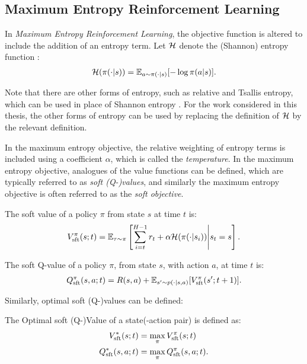 
    \subsection{Maximum Entropy Reinforcement Learning}

        In \textit{Maximum Entropy Reinforcement Learning}, the objective function is altered to include the addition of an entropy term. Let $\mathcal{H}$ denote the (Shannon) entropy function :
        \begin{align}
            \mathcal{H}(\pi(\cdot|s)) = \mathbb{E}_{a\sim\pi(\cdot|s)}[-\log \pi(a|s)].
        \end{align}

        Note that there are other forms of entropy, such as relative and Tsallis entropy, which can be used in place of Shannon entropy . For the work considered in this thesis, the other forms of entropy can be used by replacing the definition of $\mathcal{H}$ by the relevant definition.

        In the maximum entropy objective, the relative weighting of entropy terms is included using a coefficient $\alpha$, which is called the \textit{temperature}. In the maximum entropy objective, analogues of the value functions can be defined, which are typically referred to as \textit{soft (Q-)values}, and similarly the maximum entropy objective is often referred to as the \textit{soft objective}.

        \begin{defn}
            \label{def:sft_value}
            \label{def:sft_q_value}
            The \textnormal{soft value} of a policy $\pi$ from state $s$ at time $t$ is:
            \begin{align}
                V_{\textnormal{sft}}^{\pi}(s;t) = \mathbb{E}_{\tau\sim\pi}\left[\sum_{i=t}^{H-1} r_t + \alpha\mathcal{H}(\pi(\cdot|s_i)) \Bigg| s_t=s \right].
            \end{align} 

            The \textnormal{soft Q-value} of a policy $\pi$, from state $s$, with action $a$, at time $t$ is:
            \begin{align}
                Q_{\textnormal{sft}}^{\pi}(s,a;t) = R(s,a) + \mathbb{E}_{s'\sim p(\cdot|s,a)} [V_{\textnormal{sft}}^{\pi}(s';t+1)].
            \end{align} 
        \end{defn}

        Similarly, optimal soft (Q-)values can be defined:
        \begin{defn}
            \label{def:optimal_sft_value}
            \label{def:optimal_sft_q_value}
            The \textnormal{Optimal soft (Q-)Value} of a state(-action pair) is defined as:
            \begin{align}
                V_{\textnormal{sft}}^*(s;t) &= \max_{\pi} V_{\textnormal{sft}}^{\pi}(s;t) \\
                Q_{\textnormal{sft}}^*(s,a;t) &= \max_{\pi} Q_{\textnormal{sft}}^{\pi}(s,a;t).
            \end{align}
        \end{defn}

